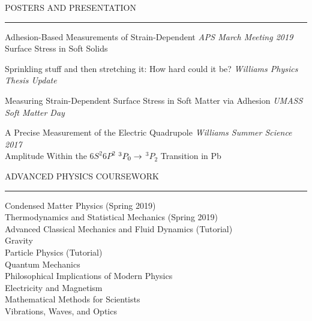 \documentclass{resume} %
\renewenvironment{rSection}[1]{
	\sectionskip
	\textcolor{RoyalPurple}{\MakeUppercase{#1}}
	\sectionlineskip
	\hrule
	\begin{list}{}{
			\setlength{\leftmargin}{1.5em}
		}
		\item[]
	}{
	\end{list}
}
\begin{document}
\begin{rSection}{Posters and Presentation} \itemsep -2pt
		\item {Adhesion-Based Measurements of Strain-Dependent \hfill {\em APS March Meeting 2019} \\Surface Stress in Soft Solids}
	\item {Sprinkling stuff and then stretching it: How hard could it be?} \hfill {\em Williams Physics Thesis Update}
		\item { Measuring Strain-Dependent Surface Stress in Soft Matter via Adhesion} \hfill {\em UMASS Soft Matter Day}
		\item { A Precise Measurement of the Electric Quadrupole \hfill {\em Williams Summer Science 2017} \\ Amplitude Within the ${6S^2 6P^2}$ \space ${^3 P_0 \space \rightarrow} \space$ ${^3P_2}$ Transition in Pb} 
	
	
	
\end{rSection}



	\begin{rSection}{Advanced Physics Coursework} \itemsep -2pt
		Condensed Matter Physics (Spring 2019) \\
		Thermodynamics and Statistical Mechanics (Spring 2019)\\
		Advanced Classical Mechanics and Fluid Dynamics (Tutorial) \\
		Gravity \\
		Particle Physics (Tutorial)\\
		Quantum Mechanics \\
		Philosophical Implications of Modern Physics \\
		Electricity and Magnetism \\
		Mathematical Methods for Scientists \\
		Vibrations, Waves, and Optics
	\end{rSection}
\end{document}

